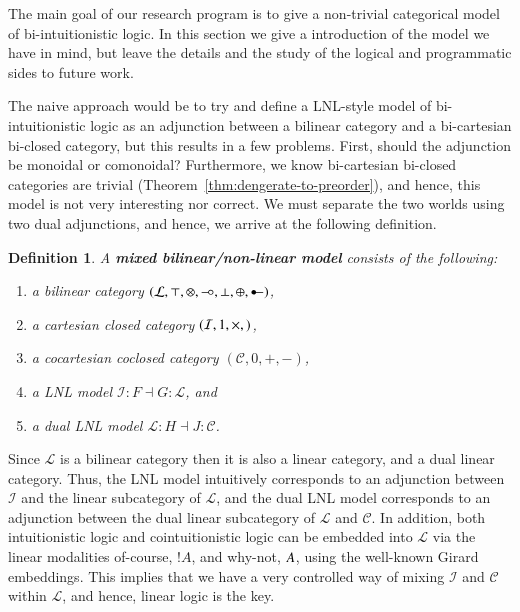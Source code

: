 \documentclass{lmcs}
\newtheorem{definition}[theorem]{Definition}
\let\to\relax
\newcommand{\to}{\rightarrow}
\let\wn\relax
\newcommand{\cat}[1]{\mathcal{#1}}
\newcommand{\limp}[0]{\multimap}
\newcommand{\colimp}[0]{\multimapdotinv}
\newcommand{\wn}[0]{\mathop{?}}
\def\limp{\mathrel{-\!\circ}}
\begin{document}
The main goal of our research program is to give a non-trivial
categorical model of bi-intuitionistic logic.  In this section we give
a introduction of the model we have in mind, but leave the details and
the study of the logical and programmatic sides to future work.

The naive approach would be to try and define a LNL-style model of
bi-intuitionistic logic as an adjunction between a bilinear category
and a bi-cartesian bi-closed category, but this results in a few
problems.  First, should the adjunction be monoidal or comonoidal?
Furthermore, we know bi-cartesian bi-closed categories are trivial
(Theorem~\ref{thm:dengerate-to-preorder}), and hence, this model is
not very interesting nor correct.  We must separate the two
worlds using two dual adjunctions, and hence, we arrive at the
following definition.
\begin{definition}
  \label{def:biLNL-model}
  A \textbf{mixed bilinear/non-linear model} consists of the
  following:
  \begin{enumerate}[label=\roman*.]
  \item a bilinear category $(\cat{L},
    \top,\otimes,\limp,\perp,\oplus,\colimp)$,
  \item a cartesian closed category $(\cat{I},1,\times,\to)$,
  \item a cocartesian coclosed category $(\cat{C},0,+,-)$, 
  \item a LNL model $\cat{I} : F \dashv G : \cat{L}$, and
  \item a dual LNL model $\cat{L} : H \dashv J : \cat{C}$.
  \end{enumerate}
\end{definition}
Since $\cat{L}$ is a bilinear category then it is also a linear
category, and a dual linear category.  Thus, the LNL model intuitively
corresponds to an adjunction between $\cat{I}$ and the linear
subcategory of $\cat{L}$, and the dual LNL model corresponds to an
adjunction between the dual linear subcategory of $\cat{L}$ and
$\cat{C}$.  In addition, both intuitionistic logic and
cointuitionistic logic can be embedded into $\cat{L}$ via the linear
modalities of-course, $!A$, and why-not, $\wn A$, using the well-known
Girard embeddings.  This implies that we have a very controlled way of
mixing $\cat{I}$ and $\cat{C}$ within $\cat{L}$, and hence, linear
logic is the key.

\end{document}
